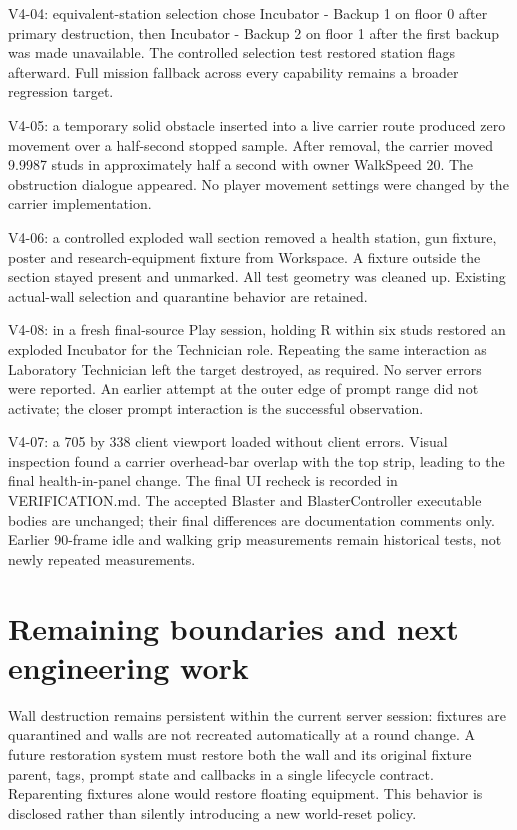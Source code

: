V4-04: equivalent-station selection chose Incubator - Backup 1 on floor 0 after primary destruction, then Incubator - Backup 2 on floor 1 after the first backup was made unavailable.\allowbreak{} The controlled selection test restored station flags afterward.\allowbreak{} Full mission fallback across every capability remains a broader regression target.\allowbreak{}

V4-05: a temporary solid obstacle inserted into a live carrier route produced zero movement over a half-second stopped sample.\allowbreak{} After removal, the carrier moved 9.\allowbreak{}9987 studs in approximately half a second with owner WalkSpeed 20.\allowbreak{} The obstruction dialogue appeared.\allowbreak{} No player movement settings were changed by the carrier implementation.\allowbreak{}

V4-06: a controlled exploded wall section removed a health station, gun fixture, poster and research-equipment fixture from Workspace.\allowbreak{} A fixture outside the section stayed present and unmarked.\allowbreak{} All test geometry was cleaned up.\allowbreak{} Existing actual-wall selection and quarantine behavior are retained.\allowbreak{}

V4-08: in a fresh final-source Play session, holding R within six studs restored an exploded Incubator for the Technician role.\allowbreak{} Repeating the same interaction as Laboratory Technician left the target destroyed, as required.\allowbreak{} No server errors were reported.\allowbreak{} An earlier attempt at the outer edge of prompt range did not activate; the closer prompt interaction is the successful observation.\allowbreak{}

V4-07: a 705 by 338 client viewport loaded without client errors.\allowbreak{} Visual inspection found a carrier overhead-bar overlap with the top strip, leading to the final health-in-panel change.\allowbreak{} The final UI recheck is recorded in VERIFICATION.\allowbreak{}md.\allowbreak{} The accepted Blaster and BlasterController executable bodies are unchanged; their final differences are documentation comments only.\allowbreak{} Earlier 90-frame idle and walking grip measurements remain historical tests, not newly repeated measurements.\allowbreak{}

\section{Remaining boundaries and next engineering work}
Wall destruction remains persistent within the current server session: fixtures are quarantined and walls are not recreated automatically at a round change.\allowbreak{} A future restoration system must restore both the wall and its original fixture parent, tags, prompt state and callbacks in a single lifecycle contract.\allowbreak{} Reparenting fixtures alone would restore floating equipment.\allowbreak{} This behavior is disclosed rather than silently introducing a new world-reset policy.\allowbreak{}

